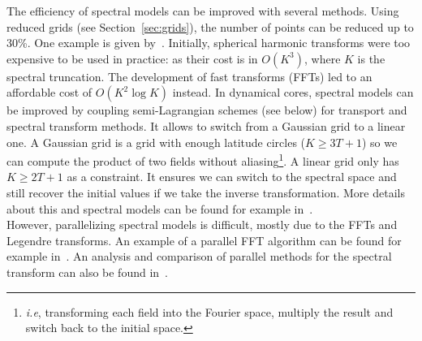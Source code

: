 The efficiency of spectral models can be improved with several methods. Using
reduced grids (see Section~\ref{sec:grids}), the number of points can be reduced
up to 30\%. One example is given by~\cite{Hortal1990}.  Initially, spherical
harmonic transforms were too expensive to be used in practice: as their cost is
in $O(K^3)$, where $K$ is the spectral truncation. The development of fast
transforms (FFTs) led to an affordable cost of $O(K^2\log K)$ instead.  In
dynamical cores, spectral models can be improved by coupling semi-Lagrangian
schemes (see below) for transport and spectral transform methods. It allows to
switch from a Gaussian grid to a linear one. A Gaussian grid is a grid with
enough latitude circles ($K\ge3T+1$) so we can compute the product of two fields
without aliasing\footnote{\textit{i.e}, transforming each field into the Fourier
space, multiply the result and switch back to the initial space.}. A linear grid
only has $K \ge 2T+1$ as a constraint.  It ensures we can switch to the spectral
space and still recover the initial values if we take the inverse
transformation. More details about this and spectral models can be found for
example in~\cite{Hack1992}.\\
However, parallelizing spectral models is difficult, mostly due to the
\glspl{FFT} and Legendre transforms. An example of a parallel FFT algorithm can
be found for example in~\cite{Swarztrauber1987}. An analysis and comparison of
parallel methods for the spectral transform can also be found
in~\cite{Foster2008}.

